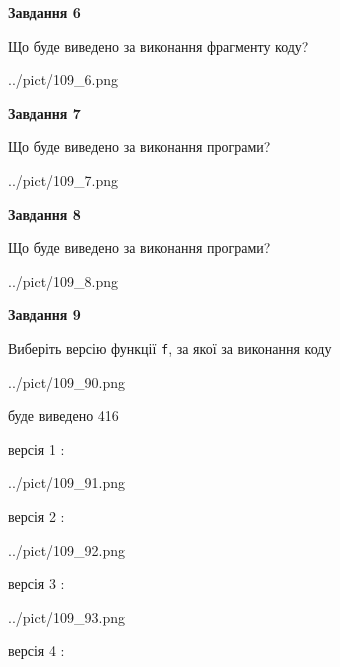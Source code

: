 \documentclass[12pt, ukrainian]{article}
\def\code#1{\Verb!#1!}
\begin{document}
{\begin {large}
{\begin {center}\textbf{Завдання 6}\end {center}}

Що буде виведено за виконання фрагменту коду?\par
\begin{center}
	{../pict/109_6.png}
\end{center}
\newpage

{\begin {center}\textbf{Завдання 7}\end {center}}

Що буде виведено за виконання програми?\par
\begin{center}
	{../pict/109_7.png}
\end{center}
\newpage

{\begin {center}\textbf{Завдання 8}\end {center}}

Що буде виведено за виконання програми?\par
\begin{center}
	{../pict/109_8.png}
\end{center}
\newpage

{\begin {center}\textbf{Завдання 9}\end {center}}

Виберіть версію функції \code{f}, за якої за виконання коду
\begin{center}
	{../pict/109_90.png}
\end{center}
буде виведено 416

\vspace{5mm}
версія 1 :

\begin{center}
	{../pict/109_91.png}
\end{center}
версія 2 :

\begin{center}
	{../pict/109_92.png}
\end{center}
версія 3 :

\begin{center}
	{../pict/109_93.png}
\end{center}
версія 4 :


\end{large}}
\end{document}
